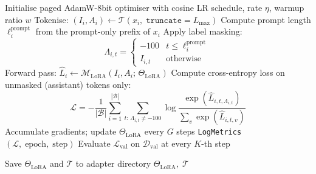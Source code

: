 \documentclass[12pt]{article}
\begin{document}
\begin{algorithm}[H]
\begin{algorithmic}[1]
\State Initialise paged AdamW-8bit optimiser with cosine LR schedule, rate $\eta$, warmup ratio $w$
        \State Tokenise: $(I_i, A_i) \gets \mathcal{T}(x_i,\;\texttt{truncate}=L_{\max})$
        \State Compute prompt length $\ell_i^{\text{prompt}}$ from the prompt-only prefix of $x_i$
        \State Apply label masking:
        \[
            \Lambda_{i,t} =
            \begin{cases}
                -100    & t \leq \ell_i^{\text{prompt}} \\
                I_{i,t} & \text{otherwise}
            \end{cases}
        \]
        \State Forward pass: $\hat{L}_i \gets \mathcal{M}_{\text{LoRA}}(I_i, A_i;\,\Theta_{\text{LoRA}})$
        \State Compute cross-entropy loss on unmasked (assistant) tokens only:
        \[
            \mathcal{L} = -\frac{1}{|\mathcal{B}|}
            \sum_{i=1}^{|\mathcal{B}|}
            \sum_{t:\,\Lambda_{i,t} \neq -100}
            \log \frac{\exp\!\left(\hat{L}_{i,t,\Lambda_{i,t}}\right)}
                      {\sum_{v} \exp\!\left(\hat{L}_{i,t,v}\right)}
        \]
        \State Accumulate gradients; update $\Theta_{\text{LoRA}}$ every $G$ steps
        \State \texttt{LogMetrics}$(\mathcal{L},\;\text{epoch},\;\text{step})$
    \EndFor
    \State Evaluate $\mathcal{L}_{\text{val}}$ on $\mathcal{D}_{\text{val}}$ at every $K$-th step
\EndFor

\State Save $\Theta_{\text{LoRA}}$ and $\mathcal{T}$ to adapter directory 
\State \Return $\Theta_{\text{LoRA}},\;\mathcal{T}$

\end{algorithmic}
\end{algorithm}
\end{document}
